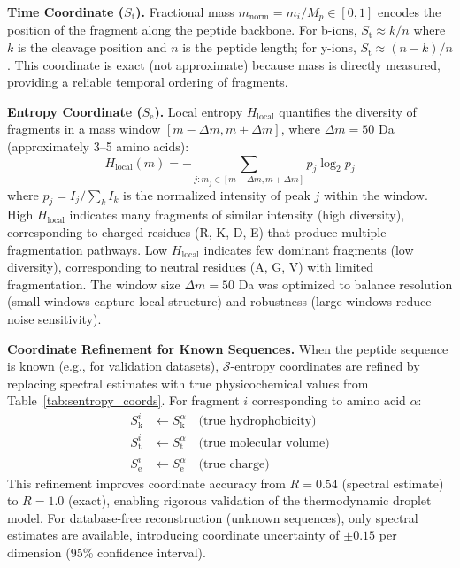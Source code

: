 \documentclass[11pt,twocolumn]{article}
\newcommand{\sentropy}{$\mathcal{S}$-entropy}
\newcommand{\Sk}{S_{\text{k}}}
\newcommand{\St}{S_{\text{t}}}
\newcommand{\Se}{S_{\text{e}}}
\begin{document}
\textbf{Time Coordinate ($\St$).} Fractional mass $m_{\text{norm}} = m_i / M_p \in [0, 1]$ encodes the position of the fragment along the peptide backbone. For b-ions, $\St \approx k/n$ where $k$ is the cleavage position and $n$ is the peptide length; for y-ions, $\St \approx (n-k)/n$. This coordinate is exact (not approximate) because mass is directly measured, providing a reliable temporal ordering of fragments.

\textbf{Entropy Coordinate ($\Se$).} Local entropy $H_{\text{local}}$ quantifies the diversity of fragments in a mass window $[m - \Delta m, m + \Delta m]$, where $\Delta m = 50$ Da (approximately 3--5 amino acids):
\begin{equation}
    H_{\text{local}}(m) = -\sum_{j: m_j \in [m - \Delta m, m + \Delta m]} p_j \log_2 p_j
    \label{eq:local_entropy}
\end{equation}
where $p_j = I_j / \sum_k I_k$ is the normalized intensity of peak $j$ within the window. High $H_{\text{local}}$ indicates many fragments of similar intensity (high diversity), corresponding to charged residues (R, K, D, E) that produce multiple fragmentation pathways. Low $H_{\text{local}}$ indicates few dominant fragments (low diversity), corresponding to neutral residues (A, G, V) with limited fragmentation. The window size $\Delta m = 50$ Da was optimized to balance resolution (small windows capture local structure) and robustness (large windows reduce noise sensitivity).

\textbf{Coordinate Refinement for Known Sequences.} When the peptide sequence is known (e.g., for validation datasets), \sentropy{} coordinates are refined by replacing spectral estimates with true physicochemical values from Table~\ref{tab:sentropy_coords}. For fragment $i$ corresponding to amino acid $\alpha$:
\begin{align}
    \Sk^i &\gets \Sk^\alpha \quad \text{(true hydrophobicity)} \\
    \St^i &\gets \St^\alpha \quad \text{(true molecular volume)} \\
    \Se^i &\gets \Se^\alpha \quad \text{(true charge)}
\end{align}
This refinement improves coordinate accuracy from $R = 0.54$ (spectral estimate) to $R = 1.0$ (exact), enabling rigorous validation of the thermodynamic droplet model. For database-free reconstruction (unknown sequences), only spectral estimates are available, introducing coordinate uncertainty of $\pm 0.15$ per dimension (95\% confidence interval).
\end{document}
